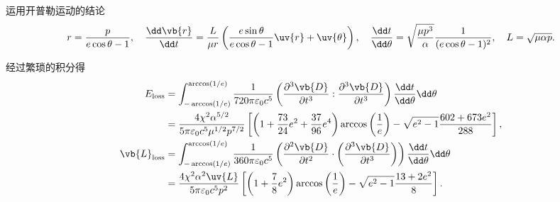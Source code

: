 \begin{exbox}
	运用开普勒运动的结论
	\begin{align*}
		r = \frac{p}{e\cos\theta - 1}, \quad \frac{\dd \vb{r}}{\dd t} = \frac{L}{\mu r} \left( \frac{e\sin\theta}{e\cos\theta - 1}\uv{r} + \uv{\theta} \right), \quad \frac{\dd t}{\dd \theta} = \sqrt{\frac{\mu p^3}{\alpha}} \frac{1}{(e\cos\theta - 1)^2}, \quad L = \sqrt{\mu\alpha p}.
	\end{align*}

	经过繁琐的积分得
	\begin{align*}
		E_{\text{loss}} &= \int_{-\arccos(1/e)}^{\arccos(1/e)} \frac{1}{720\pi\varepsilon_0 c^5} \left( \frac{\partial^3\vb{D}}{\partial t^3} : \frac{\partial^3\vb{D}}{\partial t^3} \right) \frac{\dd t}{\dd \theta} \dd \theta \\
		&= \frac{4\chi^2 \alpha^{5/2}}{5\pi\varepsilon_0 c^5 \mu^{1/2} p^{7/2}} \left[ \left( 1 + \frac{73}{24}e^2 + \frac{37}{96}e^4 \right)\arccos\left(\frac{1}{e}\right) - \sqrt{e^2 - 1} \frac{602 + 673e^2}{288} \right], \\
		\vb{L}_{\text{loss}} &= \int_{-\arccos(1/e)}^{\arccos(1/e)} \frac{1}{360\pi\varepsilon_0 c^5} \left( \frac{\partial^2\vb{D}}{\partial t^2} \cdot \left( \frac{\partial^3\vb{D}}{\partial t^3} \right) \right) \frac{\dd t}{\dd \theta} \dd \theta \\
		&= \frac{4\chi^2 \alpha^2 \uv{L}}{5\pi\varepsilon_0 c^5 p^2} \left[ \left( 1 + \frac{7}{8}e^2 \right)\arccos\left(\frac{1}{e}\right) - \sqrt{e^2 - 1} \frac{13 + 2e^2}{8} \right].
	\end{align*}
\end{exbox}
